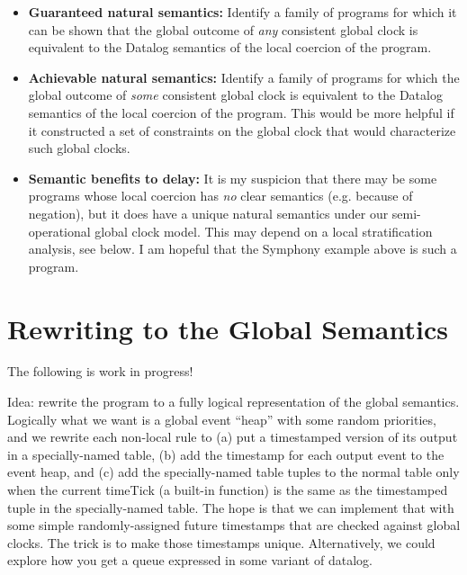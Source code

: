 \documentclass{article}
\begin{document}
\begin{itemize}
\item {\bf Guaranteed natural semantics:} Identify a family of
  programs for which it can be shown that the global outcome of {\em
    any} consistent global clock is equivalent to the Datalog
  semantics of the local coercion of the program.

\item {\bf Achievable natural semantics:} Identify a family of
  programs for which the global outcome of {\em some} consistent
  global clock is equivalent to the Datalog semantics of the local
  coercion of the program.  This would be more helpful if it constructed
  a set of constraints on the global clock that would characterize such
  global clocks.

\item {\bf Semantic benefits to delay:} It is my suspicion that there
  may be some programs whose local coercion has {\em no} clear
  semantics (e.g. because of negation), but it does have a unique natural
  semantics under our semi-operational global clock model.  This may
  depend on a local stratification analysis, see below.  I am hopeful
  that the Symphony example above is such a program.
\end{itemize}

\section{Rewriting to the Global Semantics}
The following is work in progress!

Idea: rewrite the program to a fully logical representation of the
global semantics.  Logically what we want is a global event ``heap''
with some random priorities, and we rewrite each non-local rule to (a)
put a timestamped version of its output in a specially-named table,
(b) add the timestamp for each output event to the event heap, and (c)
add the specially-named table tuples to the normal table only when the
current timeTick (a built-in function) is the same as the timestamped
tuple in the specially-named table.  The hope is that we can implement
that with some simple randomly-assigned future timestamps that are
checked against global clocks.  The trick is to make those timestamps
unique.  Alternatively, we could explore how you get a queue expressed
in some variant of datalog.
\end{document}

